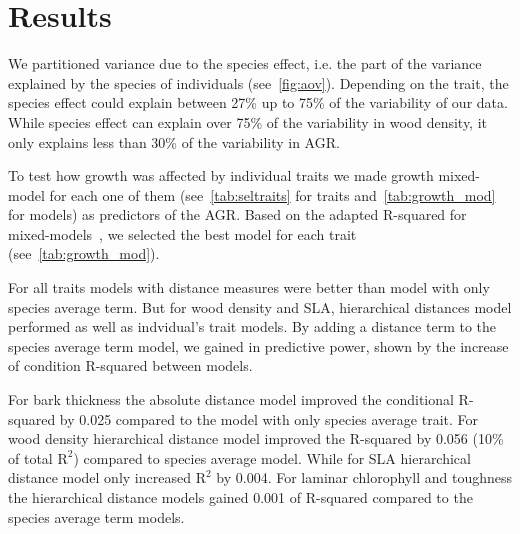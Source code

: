 \label{sec:Res}
\section*{Results}

We partitioned variance due to the species effect, i.e. the part of the variance explained by the species of individuals (see~\autoref{fig:aov}). Depending on the trait, the species effect could explain between 27\% up to 75\% of the variability of our data. While species effect can explain over 75\% of the variability in wood density, it only explains less than 30\% of the variability in AGR.

To test how growth was affected by individual traits we made growth mixed-model for each one of them (see~\autoref{tab:seltraits} for traits and~\autoref{tab:growth_mod} for models) as predictors of the AGR. Based on the adapted R-squared for mixed-models~\citep{nakagawa_general_2013}, we selected the best model for each trait (see~\autoref{tab:growth_mod}).

For all traits models with distance measures were better than model with only species average term. But for wood density and SLA, hierarchical distances model performed as well as indvidual's trait models. By adding a distance term to the species average term model, we gained in predictive power, shown by the increase of condition R-squared between models.

For bark thickness the absolute distance model improved the conditional R-squared by 0.025 compared to the model with only species average trait. For wood density hierarchical distance model improved the R-squared by 0.056 (10\% of total $\text{R}^2$) compared to species average model. While for SLA hierarchical distance model only increased $\text{R}^2$ by 0.004. For laminar chlorophyll and toughness the hierarchical distance models gained 0.001 of R-squared compared to the species average term models.

